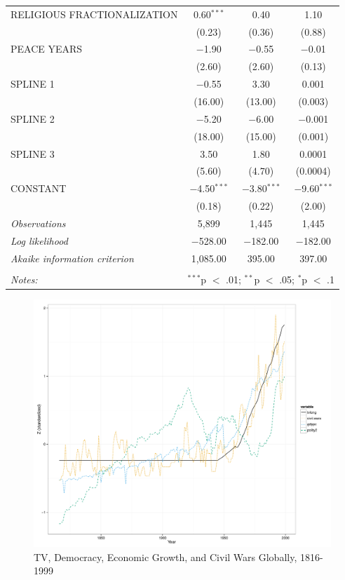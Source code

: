 \documentclass[11pt,article,oneside]{memoir}
\makeatletter
\def\maxwidth{\ifdim\Gin@nat@width>\linewidth\linewidth
\else\Gin@nat@width\fi}
\let\Oldincludegraphics\includegraphics
\renewcommand{\includegraphics}[1]{\Oldincludegraphics[width=\maxwidth]{#1}}
\makeatother
\begin{document}
\begin{table}[!htbp]
\begin{tabular}{@{\extracolsep{5pt}}lccc}
  RELIGIOUS FRACTIONALIZATION & 0.60$^{***}$ & 0.40 & 1.10 \\ 
  & (0.23) & (0.36) & (0.88) \\ 
  PEACE YEARS & $-$1.90 & $-$0.55 & $-$0.01 \\ 
  & (2.60) & (2.60) & (0.13) \\ 
  SPLINE 1 & $-$0.55 & 3.30 & 0.001 \\ 
  & (16.00) & (13.00) & (0.003) \\ 
  SPLINE 2 & $-$5.20 & $-$6.00 & $-$0.001 \\ 
  & (18.00) & (15.00) & (0.001) \\ 
  SPLINE 3 & 3.50 & 1.80 & 0.0001 \\ 
  & (5.60) & (4.70) & (0.0004) \\ 
  CONSTANT & $-$4.50$^{***}$ & $-$3.80$^{***}$ & $-$9.60$^{***}$ \\ 
  & (0.18) & (0.22) & (2.00) \\ 
 \textit{Observations} & 5,899 & 1,445 & 1,445 \\ 
\textit{Log likelihood} & $-$528.00 & $-$182.00 & $-$182.00 \\ 
\textit{Akaike information criterion} & 1,085.00 & 395.00 & 397.00 \\ 
\hline \\[-1.8ex] 
\textit{Notes:} & \multicolumn{3}{l}{$^{***}$p $<$ .01; $^{**}$p $<$ .05; $^{*}$p $<$ .1} \\ 
\end{tabular} 
\end{table}

\begin{figure}[htbp]
\centering
\includegraphics{figure/longrunplot.pdf}
\caption{TV, Democracy, Economic Growth, and Civil Wars Globally,
1816-1999}
\end{figure}
\end{document}
